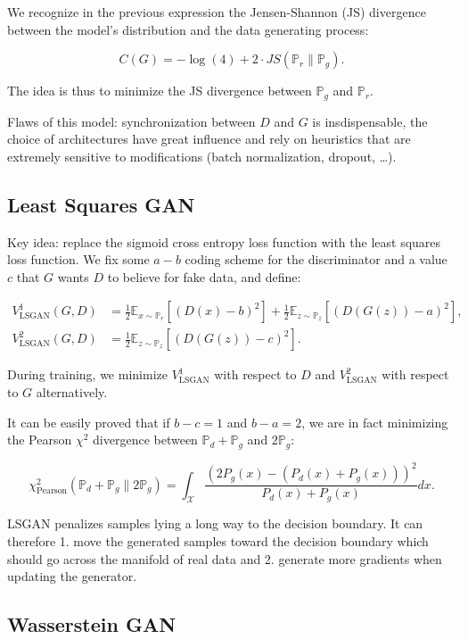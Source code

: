 We recognize in the previous expression the Jensen-Shannon (JS) divergence
between the model's distribution and the data generating process:

\[ C(G) = -\log(4) + 2 \cdot JS(\mathbb{P}_r\|\mathbb{P}_g). \]

The idea is thus to minimize the JS divergence between $\mathbb{P}_g$
and $\mathbb{P}_r$.

Flaws of this model:
synchronization between $D$ and $G$ is insdispensable,
the choice of architectures have great influence and
rely on heuristics that are extremely sensitive to modifications
(batch normalization, dropout, \dots).

\subsection*{Least Squares GAN}

Key idea: replace the sigmoid cross entropy loss function with the least
squares loss function. We fix some $a-b$ coding scheme for the discriminator
and a value $c$ that $G$ wants $D$ to believe for fake data, and define:

\begin{align*}
  V_{\mathrm{LSGAN}}^1(G, D)
  & = \frac{1}{2} \mathbb{E}_{x\sim\mathbb{P}_r}[(D(x)-b)^2]
  + \frac{1}{2} \mathbb{E}_{z\sim\mathbb{P}_z}[(D(G(z))-a)^2],\\
  V_{\mathrm{LSGAN}}^2(G, D)
  & = \frac{1}{2} \mathbb{E}_{z\sim\mathbb{P}_z}[(D(G(z))-c)^2].
\end{align*}

During training, we minimize
$V_{\mathrm{LSGAN}}^1$ with respect to $D$ and
$V_{\mathrm{LSGAN}}^2$ with respect to $G$ alternatively.

It can be easily proved that if $b-c=1$ and $b-a=2$, we are in fact minimizing
the Pearson $\chi^2$ divergence between
$\mathbb{P}_d+\mathbb{P}_g$ and $2\mathbb{P}_g$:

\[
  \chi_{\mathrm{Pearson}}^2(\mathbb{P}_d+\mathbb{P}_g\|2\mathbb{P}_g)
  = \int_{\mathcal{X}} \frac{(2P_g(x)-(P_d(x)+P_g(x)))^2}{P_d(x)+P_g(x)}dx.
\]

LSGAN penalizes samples lying a long way to the decision boundary.
It can therefore 1. move the generated samples toward the decision boundary
which should go across the manifold of real data and 2. generate more
gradients when updating the generator.

\subsection*{Wasserstein GAN}

